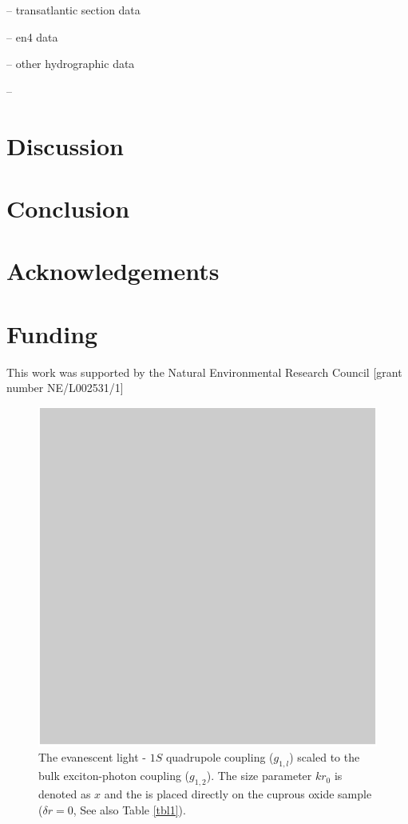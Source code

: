 \documentclass[a4paper,fleqn]{cas-sc}
\begin{document}
-- transatlantic section data

-- en4 data

-- other hydrographic data

-- 

\section{Discussion}

\section{Conclusion}

\section{Acknowledgements}

\section{Funding}

This work was supported by the Natural Environmental Research Council [grant number NE/L002531/1]



 

\begin{figure}
	\centering
		\includegraphics[scale=.75]{figs/Fig1.pdf}
	\caption{The evanescent light - $1S$ quadrupole coupling
	($g_{1,l}$) scaled to the bulk exciton-photon coupling
	($g_{1,2}$). The size parameter $kr_{0}$ is denoted as $x$ and
	the \PMS is placed directly on the cuprous oxide sample ($\delta
	r=0$, See also Table \protect\ref{tbl1}).}
	\label{FIG:1}
\end{figure}
\end{document}

